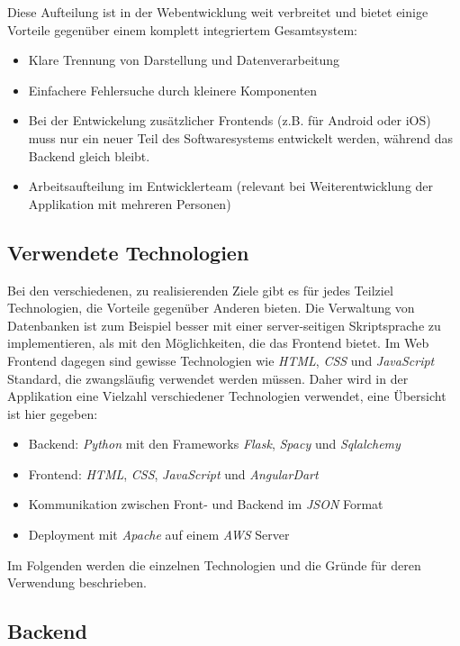 Diese Aufteilung ist in der Webentwicklung weit verbreitet\cite{Fielding:2000:ASD:932295} und bietet einige Vorteile gegenüber einem komplett integriertem Gesamtsystem:

\begin{itemize}
	\item Klare Trennung von Darstellung und Datenverarbeitung
	\item Einfachere Fehlersuche durch kleinere Komponenten
	\item Bei der Entwickelung zusätzlicher Frontends (z.B. für Android oder iOS) muss nur ein neuer Teil des Softwaresystems entwickelt werden, während das Backend gleich bleibt.
	\item Arbeitsaufteilung im Entwicklerteam (relevant bei Weiterentwicklung der Applikation mit mehreren Personen)
\end{itemize}

\subsection{Verwendete Technologien}
Bei den verschiedenen, zu realisierenden Ziele gibt es für jedes Teilziel Technologien, die Vorteile gegenüber Anderen bieten. Die Verwaltung von Datenbanken ist zum Beispiel besser mit einer server-seitigen Skriptsprache zu implementieren, als mit den Möglichkeiten, die das Frontend bietet. Im Web Frontend dagegen sind gewisse Technologien wie \textit{HTML}, \textit{CSS} und \textit{JavaScript} Standard, die zwangsläufig verwendet werden müssen. Daher wird in der Applikation eine Vielzahl verschiedener Technologien verwendet, eine Übersicht ist hier gegeben:

\begin{itemize}
	\item Backend: \textit{Python} mit den Frameworks \textit{Flask}, \textit{Spacy} und \textit{Sqlalchemy}
	\item Frontend: \textit{HTML}, \textit{CSS}, \textit{JavaScript} und \textit{AngularDart}
	\item Kommunikation zwischen Front- und Backend im \textit{JSON} Format
	\item Deployment mit \textit{Apache} auf einem \textit{AWS} Server
\end{itemize}

Im Folgenden werden die einzelnen Technologien und die Gründe für deren Verwendung beschrieben.

\subsection{Backend}
\label{sec:backend}

